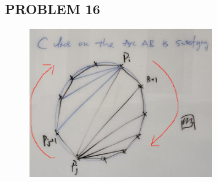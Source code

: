 \documentclass{article}
\begin{document}
\newpage

\subsection*{PROBLEM 16}

\begin{figure}[h]
    \centering
    \includegraphics[width=0.7\textwidth]{HW5_Q2.png}
    \label{fig:q2PROOF}
\end{figure}
\end{document}
